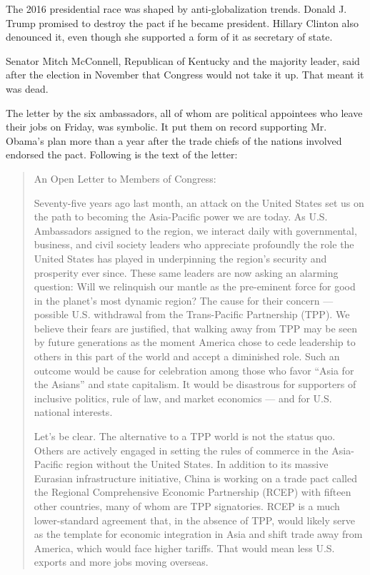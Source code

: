 The 2016 presidential race was shaped by anti-globalization trends.
Donald J. Trump promised to destroy the pact if he became president.
Hillary Clinton also denounced it, even though she supported a form of
it as secretary of state.

Senator Mitch McConnell, Republican of Kentucky and the majority leader,
said after the election in November that Congress would not take it up.
That meant it was dead.

The letter by the six ambassadors, all of whom are political appointees
who leave their jobs on Friday, was symbolic. It put them on record
supporting Mr. Obama's plan more than a year after the trade chiefs of
the nations involved endorsed the pact. Following is the text of the
letter:

\begin{quote}
An Open Letter to Members of Congress:

Seventy-five years ago last month, an attack on the United States set us
on the path to becoming the Asia-Pacific power we are today. As U.S.
Ambassadors assigned to the region, we interact daily with governmental,
business, and civil society leaders who appreciate profoundly the role
the United States has played in underpinning the region's security and
prosperity ever since. These same leaders are now asking an alarming
question: Will we relinquish our mantle as the pre-eminent force for
good in the planet's most dynamic region? The cause for their concern
--- possible U.S. withdrawal from the Trans-Pacific Partnership (TPP).
We believe their fears are justified, that walking away from TPP may be
seen by future generations as the moment America chose to cede
leadership to others in this part of the world and accept a diminished
role. Such an outcome would be cause for celebration among those who
favor ``Asia for the Asians'' and state capitalism. It would be
disastrous for supporters of inclusive politics, rule of law, and market
economics --- and for U.S. national interests.

Let's be clear. The alternative to a TPP world is not the status quo.
Others are actively engaged in setting the rules of commerce in the
Asia-Pacific region without the United States. In addition to its
massive Eurasian infrastructure initiative, China is working on a trade
pact called the Regional Comprehensive Economic Partnership (RCEP) with
fifteen other countries, many of whom are TPP signatories. RCEP is a
much lower-standard agreement that, in the absence of TPP, would likely
serve as the template for economic integration in Asia and shift trade
away from America, which would face higher tariffs. That would mean less
U.S. exports and more jobs moving overseas.


\end{quote}
